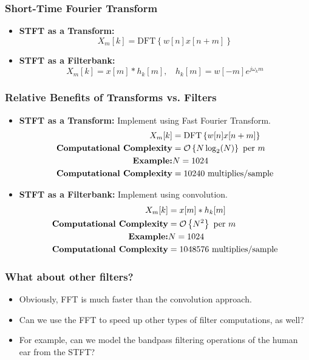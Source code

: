 \documentclass{beamer}
\begin{document}
\begin{frame}
  \frametitle{Short-Time Fourier Transform}
  \begin{itemize}
  \item {\bf STFT as a Transform:}
    \[
    X_m[k] = \mbox{DFT}\left\{w[n]x[n+m]\right\}
    \]
  \item {\bf STFT as a Filterbank:}
    \[
    X_m[k] = x[m] \ast h_k[m],~~~~h_k[m] = w[-m]e^{j\omega_k m}
    \]
  \end{itemize}
\end{frame}

\begin{frame}
  \frametitle{Relative Benefits of Transforms vs. Filters}
  \begin{itemize}
  \item {\bf STFT as a Transform:} Implement using Fast Fourier Transform.
    \begin{align*}
      X_m[k]&= \mbox{DFT}\left\{w[n]x[n+m]\right\}\\
      \mbox{\bf Computational Complexity} &= {\mathcal O}\left\{N\log_2(N)\right\}~\mbox{per}~m\\
      \mbox{\bf Example:} & N=1024\\
      \mbox{\bf Computational Complexity} &= 10240~\mbox{multiplies/sample}
    \end{align*}
  \item {\bf STFT as a Filterbank:} Implement using convolution.
    \begin{align*}
      X_m[k]&= x[m]\ast h_k[m]\\
      \mbox{\bf Computational Complexity} &= {\mathcal O}\left\{N^2\right\}~\mbox{per}~m\\
      \mbox{\bf Example:} & N=1024\\
      \mbox{\bf Computational Complexity} &= 1048576~\mbox{multiplies/sample}
    \end{align*}
  \end{itemize}
\end{frame}

\begin{frame}
  \frametitle{What about other filters?}

  \begin{itemize}
  \item Obviously, FFT is much faster than the convolution approach.
  \item Can we use the FFT to speed up other types of filter computations, as well?
  \item For example, can we model the bandpass filtering operations of the human ear
    from the STFT?
  \end{itemize}
\end{frame}
\end{document}
